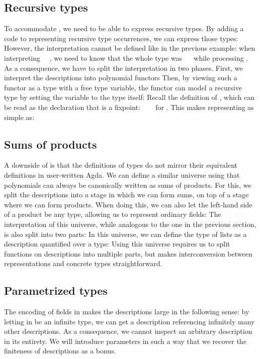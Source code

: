 \subsection{Recursive types}\label{ssec:background-rec}
To accommodate \bN{}, we need to be able to express recursive types. By adding a code  to  representing recursive type occurrences, we can express those types: 
However, the interpretation cannot be defined like in the previous example: when interpreting \ \ , we need to know that the whole type was \ \  while processing . As a consequence, we have to split the interpretation in two phases. First, we interpret the descriptions into polynomial functors
Then, by viewing such a functor as a type with a free type variable, the functor can model a recursive type by setting the variable to the type itself:
Recall the definition of \bN{}, which can be read as the declaration that  is a fixpoint: \ \ \  for . This makes representing \bN{} as simple as:

\subsection{Sums of products}\label{ssec:background-sop}
A downside of  is that the definitions of types do not mirror their equivalent definitions in user-written Agda. We can define a similar universe using that polynomials can always be canonically written as sums of products. For this, we split the descriptions into a stage in which we can form sums, on top of a stage where we can form products.
When doing this, we can also let the left-hand side of a product be any type, allowing us to represent ordinary fields:
The interpretation of this universe, while analogous to the one in the previous section, is also split into two parts:
In this universe, we can define the type of lists as a description quantified over a type:
Using this universe requires us to split functions on descriptions into multiple parts, but makes interconversion between representations and concrete types straightforward.

\subsection{Parametrized types}\label{ssec:background-par}
The encoding of fields in  makes the descriptions large in the following sense: by letting  in  be an infinite type, we can get a description referencing infinitely many other descriptions. As a consequence, we cannot inspect an arbitrary description in its entirety. We will introduce parameters in such a way that we recover the finiteness of descriptions as a bonus.

